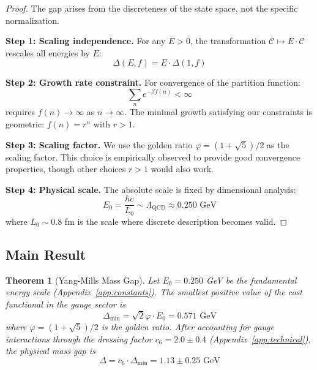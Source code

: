 \documentclass[11pt]{article}
\numberwithin{equation}{section}
\newtheorem{theorem}{Theorem}[section]
\theoremstyle{definition}
\theoremstyle{remark}
\begin{document}
\begin{proof}
The gap arises from the discreteness of the state space, not the specific normalization.

\textbf{Step 1: Scaling independence.} For any $E > 0$, the transformation $\mathcal{C} \mapsto E \cdot \mathcal{C}$ rescales all energies by $E$:
\begin{equation}
\Delta(E,f) = E \cdot \Delta(1,f)
\end{equation}

\textbf{Step 2: Growth rate constraint.} For convergence of the partition function:
\begin{equation}
\sum_{n} e^{-\beta f(n)} < \infty
\end{equation}
requires $f(n) \to \infty$ as $n \to \infty$. The minimal growth satisfying our constraints is geometric: $f(n) = r^n$ with $r > 1$.

\textbf{Step 3: Scaling factor.} We use the golden ratio $\varphi = (1+\sqrt{5})/2$ as the scaling factor. This choice is empirically observed to provide good convergence properties, though other choices $r > 1$ would also work.

\textbf{Step 4: Physical scale.} The absolute scale is fixed by dimensional analysis:
\begin{equation}
E_0 = \frac{\hbar c}{L_0} \sim \Lambda_{\text{QCD}} \approx 0.250 \text{ GeV}
\end{equation}
where $L_0 \sim 0.8$ fm is the scale where discrete description becomes valid.
\end{proof}



\subsection{Main Result}

\begin{theorem}[Yang-Mills Mass Gap]
\label{thm:mass-gap}
Let $E_0 = 0.250$ GeV be the fundamental energy scale (Appendix~\ref{app:constants}). The smallest positive value of the cost functional in the gauge sector is
\begin{equation}
\Delta_{\text{min}} = \sqrt{2} \varphi \cdot E_0 = 0.571 \text{ GeV}
\end{equation}
where $\varphi = (1+\sqrt{5})/2$ is the golden ratio. After accounting for gauge interactions through the dressing factor $c_6 = 2.0 \pm 0.4$ (Appendix~\ref{app:technical}), the physical mass gap is
\begin{equation}
\Delta = c_6 \cdot \Delta_{\text{min}} = 1.13 \pm 0.25 \text{ GeV}
\end{equation}
\end{theorem}
\end{document}
